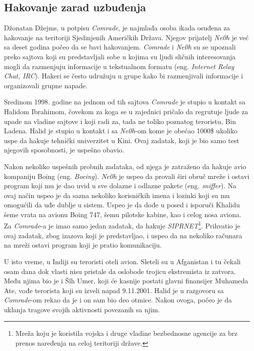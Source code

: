 \documentclass[a4paper]{article}
\begin{document}
\subsection{Hakovanje zarad uzbuđenja}
\label{mladi_hakeri}

Džonatan Džejms, u potpisu \textit{Comrade}, je najmlađa osoba ikada osuđena za hakovanje na teritoriji Sjedinjenih Američkih Država. Njegov prijatelj \textit{Ne0h} je već sa deset godina počeo da se bavi hakovanjem.  \textit{Comrade} i \textit{Ne0h} su se upoznali preko sajtova koji su predstavljali sobe u kojima su ljudi sličnih interesovanja mogli da razmenjuju informacije u tekstualnom formatu (eng. \textit{Internet Relay Chat, IRC}). Hakeri se često udružuju u grupe kako bi razmenjivali informacije i organizovali grupne napade.

Sredinom 1998. godine na jednom od tih sajtova \textit{Comrade} je stupio u kontakt sa Halidom Ibrahimom, čovekom za koga se u zajednici pričalo da regrutuje ljude za upade na vladine sajtove i koji radi za, tada ne toliko poznatog teroristu, Bin Ladena. Halid je stupio u kontakt i sa \textit{Ne0h}-om kome je obećao 1000\$ ukoliko uspe da hakuje tehnički univerzitet u Kini. Ovaj zadatak, koji je bio samo test njegovih sposobnosti, je uspešno obavio.

Nakon nekoliko uspešnih probnih zadataka, od njega je zatraženo da hakuje avio kompaniju Boing (eng. \textit{Boeing}). \textit{Ne0h} je uspeo da provali širi obruč mreže i ostavi program koji mu je dao uvid u sve dolazne i odlazne pakete (eng. \textit{sniffer}). Na ovaj način uspeo je da sazna nekoliko korisničkih imena i lozinki koji su mu omogućili da uđe dublje u sistem. Uspeo je da dođe u posed i isporuči Khalidu šeme vrata na avionu Boing 747, šemu pilotske kabine, kao i celog nosa aviona. Za \textit{Comrade}-a je imao samo jedan zadatak, da hakuje \textit{SIPRNET}\footnote{Mreža koju je koristila vojska i druge vladine bezbednosne agencije za brz prenos naređenja na celoj teritoriji države.}. Prihvatio je ovaj zadatak, zbog izazova koji je predstavljao, i uspeo da na nekoliko računara na mreži ostavi program koji je pratio komunikaciju.

U isto vreme, u Indiji su teroristi oteli avion. Sleteli su u Afganistan i tu čekali osam dana dok vlasti nisu pristale da oslobode trojicu ekstremista iz zatvora. Među njima bio je i Šîh Umer, koji će kasnije postati glavni finansijer Muhameda Ate, vođe terorista koji su izveli napad 9.11.2001. Halid je u razgovoru sa \textit{Comrade}-om rekao da je i on sam bio deo otmice. Nakon ovoga, počeo je da uklanja tragove svojih aktivnosti povezanih sa njim.
\end{document}
